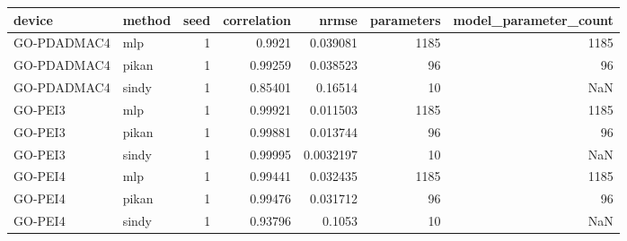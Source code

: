 \begin{tabular}{llrrrrr}
\toprule
device & method & seed & correlation & nrmse & parameters & model\_parameter\_count \\
\midrule
GO-PDADMAC4 & mlp & 1 & 0.9921 & 0.039081 & 1185 & 1185 \\
GO-PDADMAC4 & pikan & 1 & 0.99259 & 0.038523 & 96 & 96 \\
GO-PDADMAC4 & sindy & 1 & 0.85401 & 0.16514 & 10 & NaN \\
GO-PEI3 & mlp & 1 & 0.99921 & 0.011503 & 1185 & 1185 \\
GO-PEI3 & pikan & 1 & 0.99881 & 0.013744 & 96 & 96 \\
GO-PEI3 & sindy & 1 & 0.99995 & 0.0032197 & 10 & NaN \\
GO-PEI4 & mlp & 1 & 0.99441 & 0.032435 & 1185 & 1185 \\
GO-PEI4 & pikan & 1 & 0.99476 & 0.031712 & 96 & 96 \\
GO-PEI4 & sindy & 1 & 0.93796 & 0.1053 & 10 & NaN \\
\bottomrule
\end{tabular}
